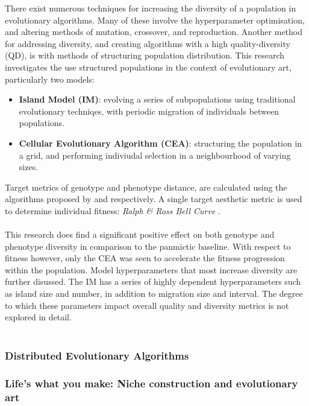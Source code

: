 \documentclass[10pt,a4paper]{article}
\begin{document}
There exist numerous techniques for increasing the diversity of a population in evolutionary algorithms.
Many of these involve the hyperparameter optimisation, and altering methods of mutation, crossover, and reproduction.
Another method for addressing diversity, and creating algorithms with a high quality-diversity (QD), is with methods of structuring population distribution.
This research investigates the use structured populations in the context of evolutionary art, particularly two models:
\begin{itemize}
	\item \textbf{Island Model (IM)}: evolving a series of subpopulations using traditional evolutionary techniqes, with periodic migration of individuals between populations.
	\item \textbf{Cellular Evolutionary Algorithm (CEA)}: structuring the population in a grid, and performing indiviudal selection in a neighbourhood of varying sizes.
\end{itemize}
Target metrics of genotype and phenotype distance, are calculated using the algorithms proposed by \cite{genotype-diversity-metric} and \cite{phenotype-diversity-metric} respectively.
A single target aesthetic metric is used to determine individual fitness: \textit{Ralph \& Ross Bell Curve} \cite{aesthetic-measures}.
\\\\
This research does find a significant positive effect on both genotype and phenotype diversity in comparison to the panmictic baseline.
With respect to fitness however, only the CEA was seen to accelerate the fitness progression within the population.
Model hyperparameters that most increase diversity are further disussed.
The IM has a series of highly dependent hyperparameters such as island size and number, in addition to migration size and interval.
The degree to which these parameters impact overall quality and diversity metrics is not explored in detail.
\\\\

\subsubsection{Distributed Evolutionary Algorithms}



\subsubsection{Life’s what you make: Niche construction and evolutionary art \cite{niche-reproduction}}
\end{document}
